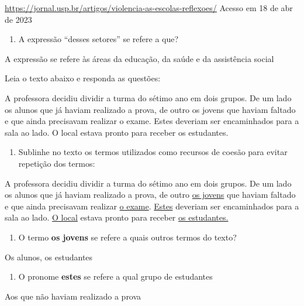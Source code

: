 {{\href{https://jornal.usp.br/artigos/violencia-as-escolas-reflexoes/}{\uline{https://jornal.usp.br/artigos/violencia-as-escolas-reflexoes/}}
Acesso em 18 de abr de 2023

\begin{enumerate}
\def\labelenumi{\arabic{enumi})}
\setcounter{enumi}{3}
\tightlist
\item
  A expressão ``desses setores'' se refere a que?
\end{enumerate}

A expressão se refere às áreas da educação, da saúde e da assistência
social

Leia o texto abaixo e responda as questões:

A professora decidiu dividir a turma do sétimo ano em dois grupos. De um
lado os alunos que já haviam realizado a prova, de outro os jovens que
haviam faltado e que ainda precisavam realizar o exame. Estes deveriam
ser encaminhados para a sala ao lado. O local estava pronto para receber
os estudantes.

\begin{enumerate}
\def\labelenumi{\arabic{enumi})}
\setcounter{enumi}{4}
\tightlist
\item
  Sublinhe no texto os termos utilizados como recursos de coesão para
  evitar repetição dos termos:
\end{enumerate}

A professora decidiu dividir a turma do sétimo ano em dois grupos. De um
lado os alunos que já haviam realizado a prova, de outro \uline{os
jovens} que haviam faltado e que ainda precisavam realizar \uline{o
exame}. \uline{Estes} deveriam ser encaminhados para a sala ao lado.
\uline{O local} estava pronto para receber \uline{os estudantes.}

\begin{enumerate}
\def\labelenumi{\arabic{enumi})}
\setcounter{enumi}{5}
\tightlist
\item
  O termo \textbf{os jovens} se refere a quais outros termos do texto?
\end{enumerate}

Os alunos, os estudantes

\begin{enumerate}
\def\labelenumi{\arabic{enumi})}
\setcounter{enumi}{6}
\tightlist
\item
  O pronome \textbf{estes} se refere a qual grupo de estudantes
\end{enumerate}

Aos que não haviam realizado a prova

}}
